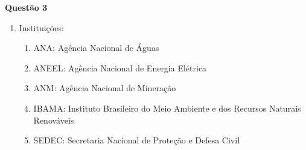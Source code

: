 \item[]\textbf{Questão 3}

\begin{enumerate}
\item Instituições: 
\begin{enumerate}
	\item ANA: Agência Nacional de Águas
	\item ANEEL: Agência Nacional de Energia Elétrica
	\item ANM: Agência Nacional de Mineração
	\item IBAMA: Instituto Brasileiro do Meio Ambiente e dos Recursos Naturais Renováveis
	\item SEDEC: Secretaria Nacional de Proteção e Defesa Civil
\end{enumerate}
\end{enumerate}
